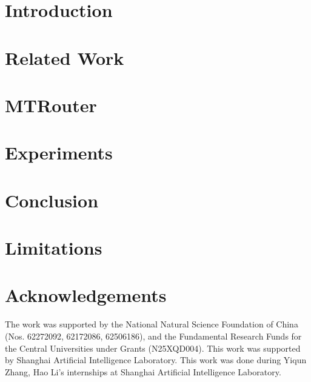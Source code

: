 \documentclass[11pt]{article}
\begin{document}
\section{Introduction}


\section{Related Work}


\section{MTRouter}
\label{sec:method}


\section{Experiments}
\label{sec:experiments}


\section{Conclusion}


\section*{Limitations}


\section*{Acknowledgements}
The work was supported by the National Natural Science Foundation of China (Nos. 62272092, 62172086, 62506186), and the Fundamental Research Funds for the Central Universities under Grants (N25XQD004). This work was supported by Shanghai Artificial Intelligence Laboratory. This work was done during Yiqun Zhang, Hao Li's internships at Shanghai Artificial Intelligence Laboratory.




\appendix

\end{document}
